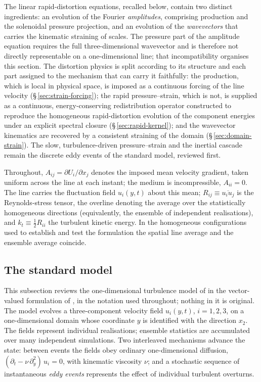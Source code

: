 \documentclass[lineno]{JFM-FLM_Au}
\begin{document}
The linear rapid-distortion equations, recalled below, contain two
distinct ingredients: an evolution of the Fourier \emph{amplitudes},
comprising production and the solenoidal pressure projection, and an
evolution of the \emph{wavevectors} that carries the kinematic straining
of scales. The pressure part of the amplitude equation requires the full
three-dimensional wavevector and is therefore not directly representable
on a one-dimensional line; that incompatibility organises this section.
The distortion physics is split according to its structure and each part
assigned to the mechanism that can carry it faithfully: the production,
which is local in physical space, is imposed as a continuous forcing of
the line velocity (\S\,\ref{sec:strain-forcing}); the rapid
pressure--strain, which is not, is supplied as a continuous,
energy-conserving redistribution operator constructed to reproduce the
homogeneous rapid-distortion evolution of the component energies under an
explicit spectral closure (\S\,\ref{sec:rapid-kernel}); and the wavevector
kinematics are recovered by a consistent straining of the domain
(\S\,\ref{sec:domain-strain}). The slow, turbulence-driven
pressure--strain and the inertial cascade remain the discrete eddy events
of the standard model, reviewed first.

Throughout, $A_{ij}=\partial U_i/\partial x_j$ denotes the imposed mean
velocity gradient, taken uniform across the line at each instant; the
medium is incompressible, $A_{ii}=0$. The line carries the fluctuation
field $u_i(y,t)$ about this mean; $R_{ij}\equiv\overline{u_iu_j}$ is the
Reynolds-stress tensor, the overline denoting the average over the
statistically homogeneous directions (equivalently, the ensemble of
independent realisations), and $k_t\equiv\tfrac12R_{ii}$ the turbulent
kinetic energy. In the homogeneous configurations used to establish and
test the formulation the spatial line average and the ensemble average
coincide.

\subsection{The standard model}\label{sec:odt-review}

This subsection reviews the one-dimensional turbulence model of
\citet{Kerstein1999} in the vector-valued formulation of
\citet{Kerstein2001}, in the notation used throughout; nothing in it is
original. The model evolves a three-component velocity field $u_i(y,t)$,
$i=1,2,3$, on a one-dimensional domain whose coordinate $y$ is identified
with the direction $x_2$. The fields represent individual realisations;
ensemble statistics are accumulated over many independent simulations.
Two interleaved mechanisms advance the state: between events the fields
obey ordinary one-dimensional diffusion,
$(\partial_t-\nu\,\partial_y^2)\,u_i=0$, with kinematic viscosity $\nu$;
and a stochastic sequence of instantaneous \emph{eddy events} represents
the effect of individual turbulent overturns.
\end{document}

